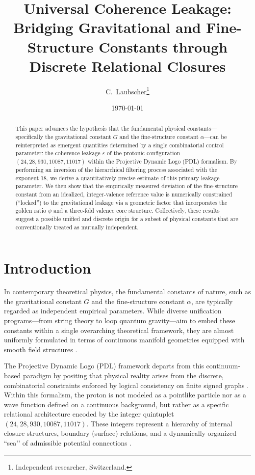 \documentclass[11pt,a4paper]{article}
\title{Universal Coherence Leakage: Bridging Gravitational and Fine-Structure Constants through Discrete Relational Closures}
\author{C.~Laubscher\thanks{Independent researcher, Switzerland.}}
\date{\today}
\begin{document}
\maketitle

\begin{abstract}
This paper advances the hypothesis that the fundamental physical constants—specifically the gravitational constant $G$ and the fine-structure constant $\alpha$—can be reinterpreted as emergent quantities determined by a single combinatorial control parameter: the coherence leakage $\varepsilon$ of the protonic configuration $(24, 28, 930, 10087, 11017)$ within the Projective Dynamic Logo (PDL) formalism. By performing an inversion of the hierarchical filtering process associated with the exponent 18, we derive a quantitatively precise estimate of this primary leakage parameter. We then show that the empirically measured deviation of the fine-structure constant from an idealized, integer-valence reference value is numerically constrained (“locked”) to the gravitational leakage via a geometric factor that incorporates the golden ratio $\phi$ and a three-fold valence core structure. Collectively, these results suggest a possible unified and discrete origin for a subset of physical constants that are conventionally treated as mutually independent.\end{abstract}

\section{Introduction}

In contemporary theoretical physics, the fundamental constants of nature, such as the gravitational constant $G$ and the fine-structure constant $\alpha$, are typically regarded as independent empirical parameters. While diverse unification programs—from string theory to loop quantum gravity—aim to embed these constants within a single overarching theoretical framework, they are almost uniformly formulated in terms of continuous manifold geometries equipped with smooth field structures \cite{PDL_Main_2026}.

The Projective Dynamic Logo (PDL) framework departs from this continuum-based paradigm by positing that physical reality arises from the discrete, combinatorial constraints enforced by logical consistency on finite signed graphs \cite{PDL_Intro_2026}. Within this formalism, the proton is not modeled as a pointlike particle nor as a wave function defined on a continuous background, but rather as a specific relational architecture encoded by the integer quintuplet $(24, 28, 930, 10087, 11017)$. These integers represent a hierarchy of internal closure structures, boundary (surface) relations, and a dynamically organized “sea’’ of admissible potential connections \cite{Combinatorial_Proton_v2_2026, PDL_Global_Mapping_2026}.
\end{document}
